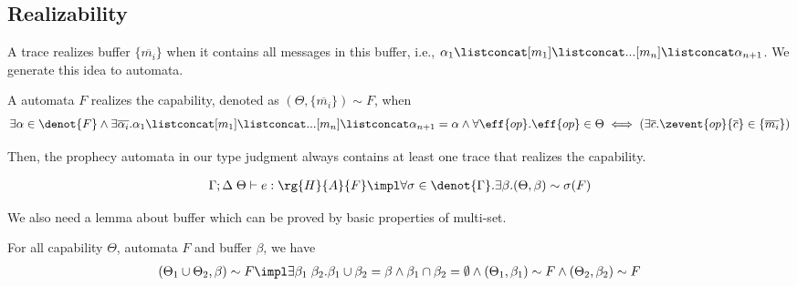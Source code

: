 \subsection{Realizability} 

A trace realizes buffer $\{\overline{m_i}\}$ when it contains all messages in this buffer, i.e., 
{\small$\alpha_1 \listconcat [m_1] \listconcat ... [m_{n}] \listconcat \alpha_{n+1}$}. We generate this idea to automata.

\begin{definition}\label{def:beta-B} A automata $F$ realizes the capability, denoted as $(\Theta, \{\overline{m_i}\}) \sim F$, when
 {\small\begin{align*}
 \exists \alpha \in \denot{F} \land \exists \overline{\alpha_i}. \alpha_1 \listconcat [m_1] \listconcat ... [m_{n}] \listconcat \alpha_{n+1} = \alpha \land 
\forall \eff{op}. \eff{op} \in \Theta \iff (\exists \overline{c}. \zevent{op}{\overline{c}} \in \{\overline{m_i}\})
\end{align*}}
\end{definition}

Then, the prophecy automata in our type judgment always contains at least one trace that realizes the capability.

\begin{lemma}\label{lemma:cap-prophecy}
 {\small\begin{align*} 
 \Gamma;\Delta\;\Theta \vdash e : \rg{H}{A}{F} \impl \forall \sigma \in\denot{\Gamma}. \exists \beta. (\Theta, \beta) \sim \sigma(F)
\end{align*}}
\end{lemma}

We also need a lemma about buffer which can be proved by basic properties of multi-set.

\begin{lemma}\label{lemma:buf-partition} For all capability $\Theta$, automata $F$ and buffer $\beta$, we have
\begin{align*}
    (\Theta_1 \cup \Theta_2, \beta) \sim F \impl
    \exists \beta_1\;\beta_2. \beta_1 \cup \beta_2 = \beta \land \beta_1 \cap \beta_2 = \emptyset \land (\Theta_1, \beta_1) \sim F \land (\Theta_2, \beta_2) \sim F
\end{align*}
\end{lemma}


